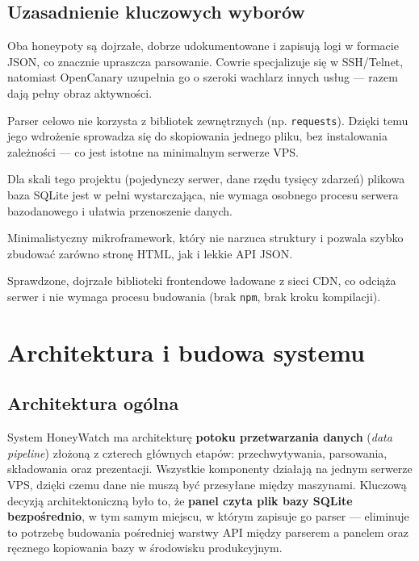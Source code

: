 \documentclass[12pt,a4paper]{report}
\begin{document}
\section{Uzasadnienie kluczowych wyborów}

\begin{description}[leftmargin=0pt,style=nextline]
  \item[Cowrie i OpenCanary] Oba honeypoty są dojrzałe, dobrze udokumentowane
        i zapisują logi w formacie JSON, co znacznie upraszcza parsowanie.
        Cowrie specjalizuje się w SSH/Telnet, natomiast OpenCanary uzupełnia go
        o szeroki wachlarz innych usług --- razem dają pełny obraz aktywności.
  \item[Python + biblioteka standardowa] Parser celowo nie korzysta z bibliotek
        zewnętrznych (np. \texttt{requests}). Dzięki temu jego wdrożenie sprowadza
        się do skopiowania jednego pliku, bez instalowania zależności --- co jest
        istotne na minimalnym serwerze VPS.
  \item[SQLite] Dla skali tego projektu (pojedynczy serwer, dane rzędu tysięcy
        zdarzeń) plikowa baza SQLite jest w pełni wystarczająca, nie wymaga
        osobnego procesu serwera bazodanowego i ułatwia przenoszenie danych.
  \item[Flask] Minimalistyczny mikroframework, który nie narzuca struktury
        i pozwala szybko zbudować zarówno stronę HTML, jak i lekkie API JSON.
  \item[Chart.js i Leaflet] Sprawdzone, dojrzałe biblioteki frontendowe
        ładowane z sieci CDN, co odciąża serwer i nie wymaga procesu budowania
        (brak \texttt{npm}, brak kroku kompilacji).
\end{description}

\chapter{Architektura i budowa systemu}
\label{ch:arch}

\section{Architektura ogólna}

System HoneyWatch ma architekturę \textbf{potoku przetwarzania danych}
(\emph{data pipeline}) złożoną z czterech głównych etapów: przechwytywania,
parsowania, składowania oraz prezentacji. Wszystkie komponenty działają na
jednym serwerze VPS, dzięki czemu dane nie muszą być przesyłane między
maszynami. Kluczową decyzją architektoniczną było to, że \textbf{panel czyta
plik bazy SQLite bezpośrednio}, w tym samym miejscu, w którym zapisuje go
parser --- eliminuje to potrzebę budowania pośredniej warstwy API między
parserem a panelem oraz ręcznego kopiowania bazy w środowisku produkcyjnym.
\end{document}
